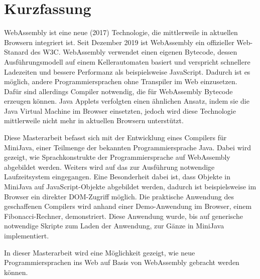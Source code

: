 \chapter{Kurzfassung}

WebAssembly ist eine neue (2017) Technologie, die mittlerweile in aktuellen Browsern integriert ist. Seit Dezember 2019 ist WebAssembly ein offizieller Web-Stanard des W3C. WebAssembly verwendet einen eigenen Bytecode, dessen Ausführungsmodell auf einem Kellerautomaten basiert und verspricht schnellere Ladezeiten und bessere Performanz als beispielsweise JavaScript. Dadurch ist es möglich, andere Programmiersprachen ohne Transpiler im Web einzusetzen. Dafür sind allerdings Compiler notwendig, die für WebAssembly Bytecode erzeugen können. Java Applets verfolgten einen ähnlichen Ansatz, indem sie die Java Virtual Machine im Browser einsetzten, jedoch wird diese Technologie mittlerweile nicht mehr in aktuellen Browsern unterstützt.

Diese Masterarbeit befasst sich mit der Entwicklung eines Compilers für MiniJava, einer Teilmenge der bekannten Programmiersprache Java. Dabei wird gezeigt, wie Sprachkonstrukte der Programmiersprache auf WebAssembly abgebildet werden. Weiters wird auf das zur Ausführung notwendige Laufzeitsystem eingegangen. Eine Besonderheit dabei ist, dass Objekte in MiniJava auf JavaScript-Objekte abgebildet werden, dadurch ist beispielsweise im Browser ein direkter DOM-Zugriff möglich. Die praktische Anwendung des geschaffenen Compilers wird anhand einer Demo-Anwendung im Browser, einem Fibonacci-Rechner, demonstriert. Diese Anwendung wurde, bis auf generische notwendige Skripte zum Laden der Anwendung, zur Gänze in MiniJava implementiert.

In dieser Masterarbeit wird eine Möglichkeit gezeigt, wie neue Programmiersprachen ins Web auf Basis von WebAssembly gebracht werden können.
